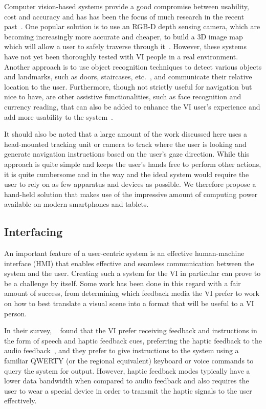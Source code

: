 \documentclass[format=sigconf, review=true, screen=true, anonymous=true]{acmart}
\begin{document}
Computer vision-based systems provide a good compromise between usability, cost and accuracy and has has been the focus of much research in the recent past~\cite{manduchi2014last}. One popular solution is to use an RGB-D depth sensing camera, which are becoming increasingly more accurate and cheaper, to build a 3D image map which will allow a user to safely traverse through it~\cite{lee2015, rodriguez2012obstacle}. However, these systems have not yet been thoroughly tested with VI people in a real environment. Another approach is to use object recognition techniques to detect various objects and landmarks, such as doors, staircases, etc.~\cite{tian2013b}, and communicate their relative location to the user. Furthermore, though not strictly useful for navigation but nice to have, are other assistive functionalities, such as face recognition and currency reading, that can also be added to enhance the VI user's experience and add more usability to the system~\cite{chessa2016}.

It should also be noted that a large amount of the work discussed here uses a head-mounted tracking unit or camera to track where the user is looking and generate navigation instructions based on the user's gaze direction. While this approach is quite simple and keeps the user's hands free to perform other actions, it is quite cumbersome and in the way and the ideal system would require the user to rely on as few apparatus and devices as possible. We therefore propose a hand-held solution that makes use of the impressive amount of computing power available on modern smartphones and tablets. 

\subsection{Interfacing}

An important feature of a user-centric system is an effective human-machine interface (HMI) that enables effective and seamless communication between the system and the user. Creating such a system for the VI in particular can prove to be a challenge by itself. Some work has been done in this regard with a fair amount of success, from determining which feedback media the VI prefer to work on how to best translate a visual scene into a format that will be useful to a VI person. 

In their survey, \citeauthor{khoo2016multimodal}~\cite{khoo2016multimodal} found that the VI prefer receiving feedback and instructions in the form of speech and haptic feedback cues, preferring the haptic feedback to the audio feedback~\cite{ross2000wearable}, and they prefer to give instructions to the system using a familiar QWERTY (or the regional equivalent) keyboard or voice commands to query the system for output. However, haptic feedback modes typically have a lower data bandwidth when compared to audio feedback and also requires the user to wear a special device in order to transmit the haptic signals to the user effectively. 
\end{document}
